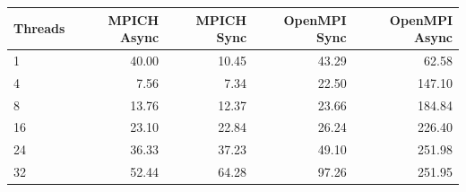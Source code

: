 \begin{tabular}{lrrrr}
\toprule
Threads & MPICH Async & MPICH Sync & OpenMPI Sync & OpenMPI Async \\ \midrule
1 & 40.00 & 10.45 & 43.29 & 62.58 \\
4 & 7.56 & 7.34 & 22.50 & 147.10 \\
8 & 13.76 & 12.37 & 23.66 & 184.84 \\
16 & 23.10 & 22.84 & 26.24 & 226.40 \\
24 & 36.33 & 37.23 & 49.10 & 251.98 \\
32 & 52.44 & 64.28 & 97.26 & 251.95 \\
\bottomrule
\end{tabular}